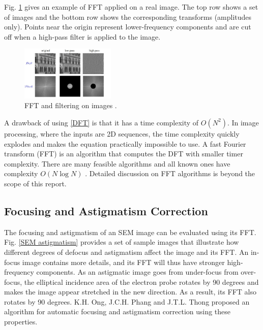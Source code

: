 \documentclass[conference]{IEEEtran}
\begin{document}
Fig. \ref{FFT on images} gives an example of FFT applied on a real image. The top row shows a set of images and the bottom row shows the corresponding transforms (amplitudes only). Points near the origin represent lower-frequency components and are cut off when a high-pass filter is applied to the image.

\begin{figure}[htbp]
    \centering
    \includegraphics[width=0.4\textwidth]{Images/FFT on images.jpg}
    \caption{FFT and filtering on images \cite{Fourier transform lecture}.}
    \label{FFT on images}
\end{figure}

A drawback of using \eqref{DFT} is that it has a time complexity of $O(N^2)$. In image processing, where the inputs are 2D sequences, the time complexity quickly explodes and makes the equation practically impossible to use. A fast Fourier transform (FFT) is an algorithm that computes the DFT with smaller timer complexity. There are many feasible algorithms and all known ones have complexity $O(N\log N)$ \cite{Fast Fourier transform wiki}. Detailed discussion on FFT algorithms is beyond the scope of this report.

\subsection{Focusing and Astigmatism Correction}
The focusing and astigmatism of an SEM image can be evaluated using its FFT. Fig. \ref{SEM astigmatism} provides a set of sample images that illustrate how different degrees of defocus and astigmatism affect the image and its FFT. An in-focus image contains more details, and its FFT will thus have stronger high-frequency components. As an astigmatic image goes from under-focus from over-focus, the elliptical incidence area of the electron probe rotates by 90 degrees and makes the image appear stretched in the new direction. As a result, its FFT also rotates by 90 degrees. K.H. Ong, J.C.H. Phang and J.T.L. Thong proposed an algorithm for automatic focusing and astigmatism correction \cite{SEM astigmatation correction algorithm} using these properties.
\end{document}
